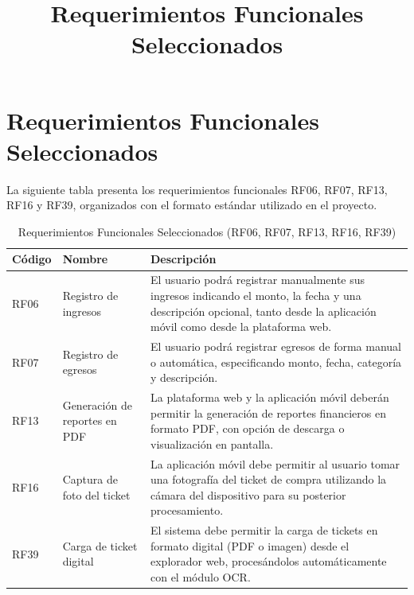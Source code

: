 \documentclass[12pt,a4paper]{article}
\title{Requerimientos Funcionales Seleccionados}
\author{}
\date{}
\begin{document}
\maketitle

\section{Requerimientos Funcionales Seleccionados}

La siguiente tabla presenta los requerimientos funcionales RF06, RF07, RF13, RF16 y RF39, organizados con el formato estándar utilizado en el proyecto.

\begin{table}[H]
\centering
\renewcommand{\arraystretch}{1.2}
\begin{tabularx}{\textwidth}{@{} l l X @{}}
\toprule
\textbf{Código} & \textbf{Nombre} & \textbf{Descripción} \\
\midrule

RF06 & Registro de ingresos &
El usuario podrá registrar manualmente sus ingresos indicando el monto, la fecha y una descripción opcional, tanto desde la aplicación móvil como desde la plataforma web. \\

RF07 & Registro de egresos &
El usuario podrá registrar egresos de forma manual o automática, especificando monto, fecha, categoría y descripción. \\

RF13 & Generación de reportes en PDF &
La plataforma web y la aplicación móvil deberán permitir la generación de reportes financieros en formato PDF, con opción de descarga o visualización en pantalla. \\

RF16 & Captura de foto del ticket &
La aplicación móvil debe permitir al usuario tomar una fotografía del ticket de compra utilizando la cámara del dispositivo para su posterior procesamiento. \\

RF39 & Carga de ticket digital &
El sistema debe permitir la carga de tickets en formato digital (PDF o imagen) desde el explorador web, procesándolos automáticamente con el módulo OCR. \\

\bottomrule
\end{tabularx}
\caption{Requerimientos Funcionales Seleccionados (RF06, RF07, RF13, RF16, RF39)}
\end{table}
\end{document}
